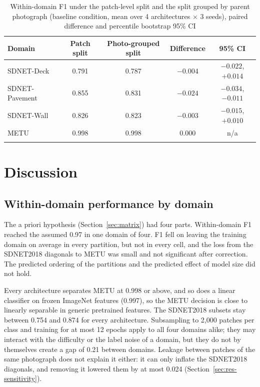 \documentclass[pdflatex,sn-apa]{sn-jnl}
\begin{document}
\begin{table}[t]
\caption{Within-domain F1 under the patch-level split and the split grouped by parent photograph (baseline condition, mean over 4 architectures $\times$ 3 seeds), paired difference and percentile bootstrap 95\% CI}\label{tab:sens}
\begin{tabular*}{\textwidth}{@{\extracolsep\fill}lcccc@{}}
\toprule
Domain & Patch split & Photo-grouped split & Difference & 95\% CI \\
\midrule
SDNET-Deck & 0.791 & 0.787 & $-0.004$ & $-0.022$, $+0.014$ \\
SDNET-Pavement & 0.855 & 0.831 & $-0.024$ & $-0.034$, $-0.011$ \\
SDNET-Wall & 0.826 & 0.823 & $-0.003$ & $-0.015$, $+0.010$ \\
METU & 0.998 & 0.998 & 0.000 & n/a \\
\botrule
\end{tabular*}
\end{table}

\section{Discussion}\label{sec:discussion}

\subsection{Within-domain performance by domain}\label{sec:disc-diagonal}

The a priori hypothesis (Section~\ref{sec:matrix}) had four parts. Within-domain F1 reached the assumed 0.97 in one domain of four. F1 fell on leaving the training domain on average in every partition, but not in every cell, and the loss from the SDNET2018 diagonals to METU was small and not significant after correction. The predicted ordering of the partitions and the predicted effect of model size did not hold.

Every architecture separates METU at 0.998 or above, and so does a linear classifier on frozen ImageNet features (0.997), so the METU decision is close to linearly separable in generic pretrained features. The SDNET2018 subsets stay between 0.754 and 0.874 for every architecture. Subsampling to 2,000 patches per class and training for at most 12 epochs apply to all four domains alike; they may interact with the difficulty or the label noise of a domain, but they do not by themselves create a gap of 0.21 between domains. Leakage between patches of the same photograph does not explain it either: it can only inflate the SDNET2018 diagonals, and removing it lowered them by at most 0.024 (Section~\ref{sec:res-sensitivity}).
\end{document}

